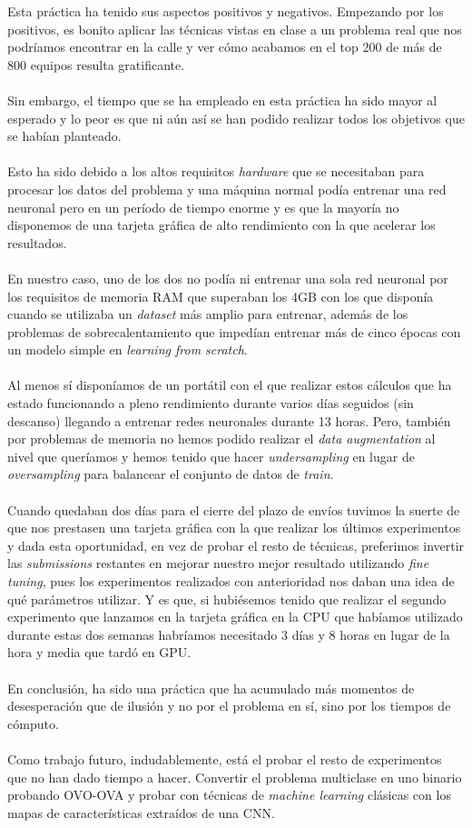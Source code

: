 Esta práctica ha tenido sus aspectos positivos y negativos. Empezando por los positivos, es bonito aplicar las técnicas vistas en clase a un problema real que nos podríamos encontrar en la calle y ver cómo acabamos en el top 200 de más de 800 equipos resulta gratificante.
\\ \\
Sin embargo, el tiempo que se ha empleado en esta práctica ha sido mayor al esperado y lo peor es que ni aún así se han podido realizar todos los objetivos que se habían planteado.
\\ \\
Esto ha sido debido a los altos requisitos \textit{hardware} que se necesitaban para procesar los datos del problema y una máquina normal podía entrenar una red neuronal pero en un período de tiempo enorme y es que la mayoría no disponemos de una tarjeta gráfica de alto rendimiento con la que acelerar los resultados.
\\ \\
En nuestro caso, uno de los dos no podía ni entrenar una sola red neuronal por los requisitos de memoria RAM que superaban los 4GB con los que disponía cuando se utilizaba un \textit{dataset} más amplio para entrenar, además de los problemas de sobrecalentamiento que impedían entrenar más de cinco épocas con un modelo simple en \textit{learning from scratch}.
\\ \\
Al menos sí disponíamos de un portátil con el que realizar estos cálculos que ha estado funcionando a pleno rendimiento durante varios días seguidos (sin descanso) llegando a entrenar redes neuronales durante 13 horas. Pero, también por problemas de memoria no hemos podido realizar el \textit{data augmentation} al nivel que queríamos y hemos tenido que hacer \textit{undersampling} en lugar de \textit{oversampling} para balancear el conjunto de datos de \textit{train}.
\\ \\
Cuando quedaban dos días para el cierre del plazo de envíos tuvimos la suerte de que nos prestasen una tarjeta gráfica con la que realizar los últimos experimentos y dada esta oportunidad, en vez de probar el resto de técnicas, preferimos invertir las \textit{submissions} restantes en mejorar nuestro mejor resultado utilizando \textit{fine tuning}, pues los experimentos realizados con anterioridad nos daban una idea de qué parámetros utilizar. Y es que, si hubiésemos tenido que realizar el segundo experimento que lanzamos en la tarjeta gráfica en la CPU que habíamos utilizado durante estas dos semanas habríamos necesitado 3 días y 8 horas en lugar de la hora y media que tardó en GPU.
\\ \\
En conclusión, ha sido una práctica que ha acumulado más momentos de desesperación que de ilusión y no por el problema en sí, sino por los tiempos de cómputo.
\\ \\
Como trabajo futuro, indudablemente, está el probar el resto de experimentos que no han dado tiempo a hacer. Convertir el problema multiclase en uno binario probando OVO-OVA y probar con técnicas de \textit{machine learning} clásicas con los mapas de características extraídos de una CNN.

